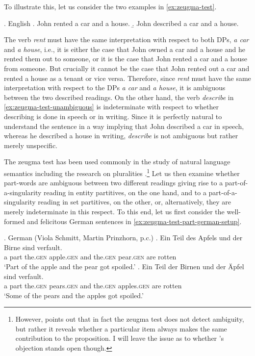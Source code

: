 To illustrate this, let us consider the two examples in \ref{ex:zeugma-test}. 

\ex.\label{ex:zeugma-test} English \citep[p. 94; adapted]{lasersohn1995plurality} 
\a. John rented a car and a house.\label{ex:zeugma-test-ambiguous}
\b. John described a car and a house.\label{ex:zeugma-test-unambiguous}

The verb \textit{rent} must have the same interpretation with respect to both DPs, \textit{a car} and \textit{a house}, i.e., it is either the case that John owned a car and a house and he rented them out to someone, or it is the case that John rented a car and a house from someone. But crucially it cannot be the case that John rented out a car and rented a house as a tenant or vice versa. Therefore, since \textit{rent} must have the same interpretation with respect to the DPs \textit{a car} and \textit{a house}, it is ambiguous between the two described readings. On the other hand, the verb \textit{describe} in \ref{ex:zeugma-test-unambiguous} is indeterminate with respect to whether describing is done in speech or in writing. Since it is perfectly natural to understand the sentence in a way implying that John described a car in speech, whereas he described a house in writing, \textit{describe} is not ambiguous but rather merely unspecific.

The zeugma test has been used commonly in the study of natural language semantics including the research on pluralities \citep[see, e.g.,][]{dowty1987collective,lasersohn1995plurality,nouwen2016plurality}.\footnote{However, \citet[p. 95]{lasersohn1995plurality} points out that in fact the zeugma test does not detect ambiguity, but rather it reveals whether a particular item always makes the same contribution to the proposition. I will leave the issue as to whether \citeauthor{lasersohn1995plurality}'s objection stands open though.} Let us then examine whether part-words are ambiguous between two different readings giving rise to a part-of-a-singularity reading in entity partitives, on the one hand, and to a part-of-a-singularity reading in set partitives, on the other, or, alternatively, they are merely indeterminate in this respect. To this end, let us first consider the well-formed and felicitous German sentences in \ref{ex:zeugma-test-part-german-setup}. 

\ex.\label{ex:zeugma-test-part-german-setup} German (Viola Schmitt, Martin Prinzhorn, p.c.)
\ag. Ein Teil des Apfels und der Birne sind verfault.\label{ex:zeugma-test-part-sg-german-setup}\\
a part the\textsc{.gen} apple\textsc{.gen} and the\textsc{.gen} pear\textsc{.gen} are rotten\\
`Part of the apple and the pear got spoiled.'
\bg. Ein Teil der Birnen und der Äpfel sind verfault.\label{ex:zeugma-test-part-pl-german-setup}\\
a part the\textsc{.gen} pears\textsc{.gen} and the\textsc{.gen} apples\textsc{.gen} are rotten\\
`Some of the pears and the apples got spoiled.'

